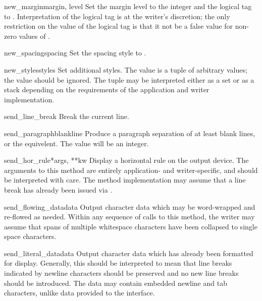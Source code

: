 \begin{methoddesc}[writer]{new_margin}{margin, level}
Set the margin level to the integer  and the logical tag
to .  Interpretation of the logical tag is at the
writer's discretion; the only restriction on the value of the logical
tag is that it not be a false value for non-zero values of
.
\end{methoddesc}

\begin{methoddesc}[writer]{new_spacing}{spacing}
Set the spacing style to .
\end{methoddesc}

\begin{methoddesc}[writer]{new_styles}{styles}
Set additional styles.  The  value is a tuple of
arbitrary values; the value  should be ignored.  The
 tuple may be interpreted either as a set or as a stack
depending on the requirements of the application and writer
implementation.
\end{methoddesc}

\begin{methoddesc}[writer]{send_line_break}{}
Break the current line.
\end{methoddesc}

\begin{methoddesc}[writer]{send_paragraph}{blankline}
Produce a paragraph separation of at least  blank
lines, or the equivelent.  The  value will be an
integer.
\end{methoddesc}

\begin{methoddesc}[writer]{send_hor_rule}{*args, **kw}
Display a horizontal rule on the output device.  The arguments to this
method are entirely application- and writer-specific, and should be
interpreted with care.  The method implementation may assume that a
line break has already been issued via .
\end{methoddesc}

\begin{methoddesc}[writer]{send_flowing_data}{data}
Output character data which may be word-wrapped and re-flowed as
needed.  Within any sequence of calls to this method, the writer may
assume that spans of multiple whitespace characters have been
collapsed to single space characters.
\end{methoddesc}

\begin{methoddesc}[writer]{send_literal_data}{data}
Output character data which has already been formatted
for display.  Generally, this should be interpreted to mean that line
breaks indicated by newline characters should be preserved and no new
line breaks should be introduced.  The data may contain embedded
newline and tab characters, unlike data provided to the
 interface.
\end{methoddesc}

